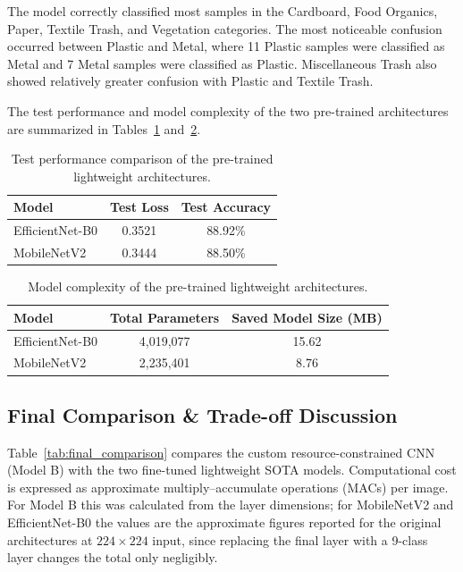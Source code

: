 \documentclass[12pt,a4paper]{article}
\begin{document}
The model correctly classified most samples in the Cardboard, Food
Organics, Paper, Textile Trash, and Vegetation categories. The most
noticeable confusion occurred between Plastic and Metal, where 11 Plastic
samples were classified as Metal and 7 Metal samples were classified as
Plastic. Miscellaneous Trash also showed relatively greater confusion with
Plastic and Textile Trash.

The test performance and model complexity of the two pre-trained
architectures are summarized in Tables~\ref{tab:pretrained_performance}
and~\ref{tab:model_complexity}.

\begin{table}[H]
    \centering
    \caption{Test performance comparison of the pre-trained lightweight architectures.}
    \label{tab:pretrained_performance}
    \begin{tabular}{lcc}
        \hline
        Model & Test Loss & Test Accuracy \\
        \hline
        EfficientNet-B0 & 0.3521 & 88.92\% \\
        MobileNetV2 & 0.3444 & 88.50\% \\
        \hline
    \end{tabular}
\end{table}

\begin{table}[H]
    \centering
    \caption{Model complexity of the pre-trained lightweight architectures.}
    \label{tab:model_complexity}
    \begin{tabular}{lcc}
        \hline
        Model & Total Parameters & Saved Model Size (MB) \\
        \hline
        EfficientNet-B0 & 4,019,077 & 15.62 \\
        MobileNetV2 & 2,235,401 & 8.76 \\
        \hline
    \end{tabular}
\end{table}

\newpage
\subsection{Final Comparison \& Trade-off Discussion}

Table~\ref{tab:final_comparison} compares the custom resource-constrained
CNN (Model B) with the two fine-tuned lightweight SOTA models.
Computational cost is expressed as approximate multiply--accumulate
operations (MACs) per image. For Model B this was calculated from the
layer dimensions; for MobileNetV2 and EfficientNet-B0 the values are the
approximate figures reported for the original architectures at
$224\times224$ input, since replacing the final layer with a 9-class
layer changes the total only negligibly.
\end{document}
